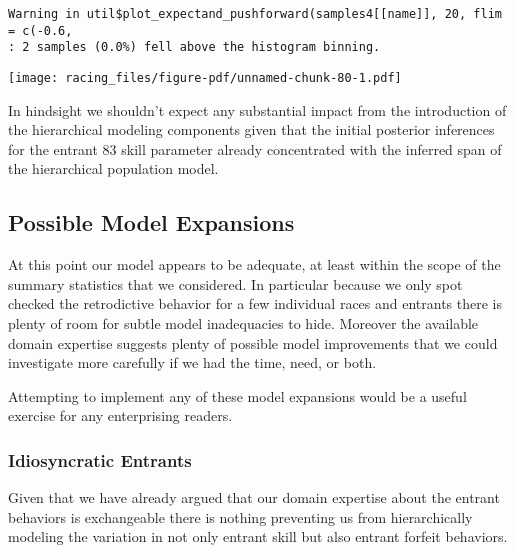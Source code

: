 \documentclass[
  letterpaper,
  DIV=11,
  numbers=noendperiod]{scrartcl}
\newenvironment{Shaded}{\begin{snugshade}}{\end{snugshade}}
\newcommand{\AttributeTok}[1]{\textcolor[rgb]{0.40,0.45,0.13}{#1}}
\newcommand{\DecValTok}[1]{\textcolor[rgb]{0.68,0.00,0.00}{#1}}
\newcommand{\FloatTok}[1]{\textcolor[rgb]{0.68,0.00,0.00}{#1}}
\newcommand{\FunctionTok}[1]{\textcolor[rgb]{0.28,0.35,0.67}{#1}}
\newcommand{\NormalTok}[1]{\textcolor[rgb]{0.00,0.23,0.31}{#1}}
\newcommand{\SpecialCharTok}[1]{\textcolor[rgb]{0.37,0.37,0.37}{#1}}
\newcommand{\StringTok}[1]{\textcolor[rgb]{0.13,0.47,0.30}{#1}}
\begin{document}
\begin{verbatim}
Warning in util$plot_expectand_pushforward(samples4[[name]], 20, flim = c(-0.6,
: 2 samples (0.0%) fell above the histogram binning.
\end{verbatim}

\begin{Shaded}
\end{Shaded}

\texttt{[image: racing\_files/figure-pdf/unnamed-chunk-80-1.pdf]}

In hindsight we shouldn't expect any substantial impact from the
introduction of the hierarchical modeling components given that the
initial posterior inferences for the entrant 83 skill parameter already
concentrated with the inferred span of the hierarchical population
model.

\subsection{Possible Model Expansions}\label{possible-model-expansions}

At this point our model appears to be adequate, at least within the
scope of the summary statistics that we considered. In particular
because we only spot checked the retrodictive behavior for a few
individual races and entrants there is plenty of room for subtle model
inadequacies to hide. Moreover the available domain expertise suggests
plenty of possible model improvements that we could investigate more
carefully if we had the time, need, or both.

Attempting to implement any of these model expansions would be a useful
exercise for any enterprising readers.

\subsubsection{Idiosyncratic Entrants}\label{idiosyncratic-entrants}

Given that we have already argued that our domain expertise about the
entrant behaviors is exchangeable there is nothing preventing us from
hierarchically modeling the variation in not only entrant skill but also
entrant forfeit behaviors.
\end{document}
